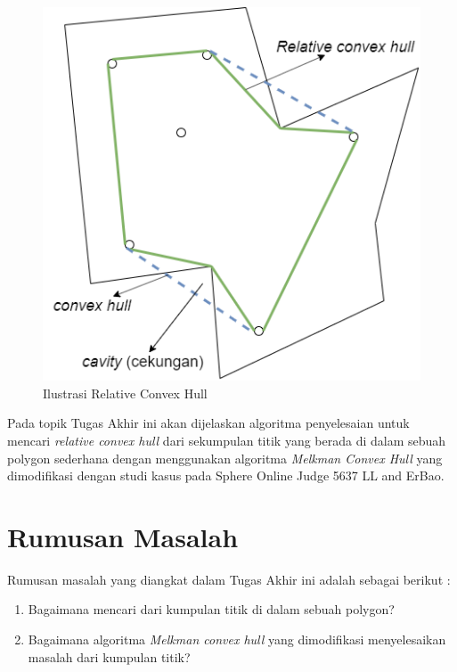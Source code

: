 \begin{figure}[!h]
	\Centering
	\includegraphics [width=0.5\columnwidth]{bab2/img/ilustrasi-relative-convex-hull}
	\caption {Ilustrasi Relative Convex Hull}
	\label {fig:ilustrasi-relative-convex-hull}
\end{figure}

\par Pada topik Tugas Akhir ini akan dijelaskan algoritma penyelesaian untuk mencari \textit{relative convex hull} dari sekumpulan titik yang berada di dalam sebuah polygon sederhana dengan menggunakan algoritma \textit{Melkman Convex Hull} yang dimodifikasi dengan studi kasus pada Sphere Online Judge 5637 LL and ErBao.

\section {Rumusan Masalah}

Rumusan masalah yang diangkat dalam Tugas Akhir ini adalah sebagai berikut :

\begin {enumerate}
    \item Bagaimana mencari \RCH dari kumpulan titik di dalam sebuah polygon?
    \item Bagaimana algoritma \textit{Melkman convex hull} yang dimodifikasi menyelesaikan masalah \RCH dari kumpulan titik?
\end {enumerate}

